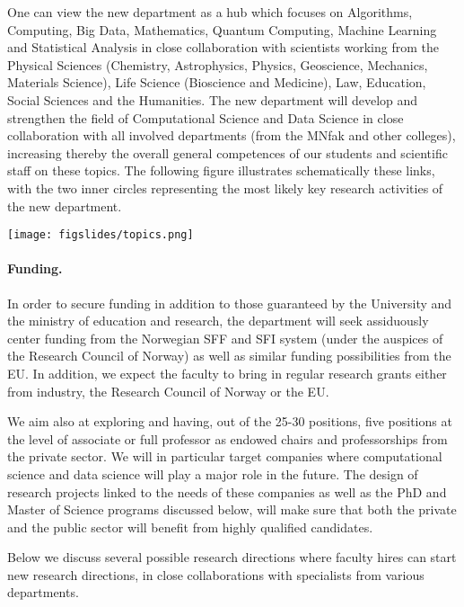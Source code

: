 \documentclass[%
oneside,                 %
final,                   %
10pt]{article}
\begin{document}
One can view the new department as a hub which focuses on Algorithms, Computing, Big Data, Mathematics, Quantum Computing, Machine Learning and Statistical Analysis in close collaboration with scientists working from the Physical Sciences (Chemistry, Astrophysics, Physics, Geoscience, Mechanics, Materials Science), Life Science (Bioscience and Medicine), Law, Education, Social Sciences and the Humanities. The new department will develop and strengthen the field of Computational Science and Data Science in close collaboration with all involved departments (from the MNfak and other colleges), increasing thereby the overall general competences of our students and scientific staff on these topics. 
The following figure illustrates schematically these links, with the two inner circles representing the most likely key research activities of the new department. 



\vspace{6mm}

\centerline{\texttt{[image: figslides/topics.png]}}

\vspace{6mm}



\paragraph{Funding.}
In order to secure funding in addition to those guaranteed by the University and the ministry of education and research, the department will seek assiduously center funding  from the Norwegian SFF and SFI system (under the auspices of the Research Council of Norway) as well as similar funding possibilities  from the EU. In addition, we expect the faculty to bring in regular research grants either from industry, the Research Council of Norway or the EU. 

We aim also at exploring and having, out of the 25-30 positions, five positions at the level of associate or full professor as endowed chairs and professorships from the private sector. We will in particular target companies where computational science and data science will play a major role in the future. The design of research projects linked to the needs of these companies as well as the PhD and Master of Science programs discussed below, will make sure that both the private and the public sector will benefit from highly qualified candidates.  

Below we discuss several  possible research directions where  faculty hires can start new research directions, in close collaborations with specialists from various departments.
\end{document}
